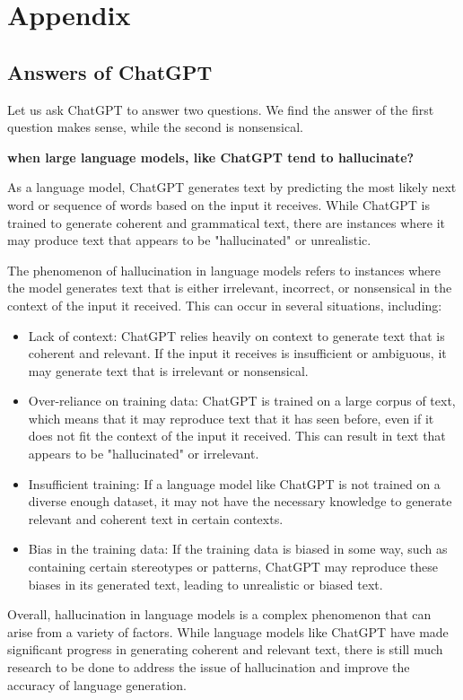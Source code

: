 \section{Appendix}
\label{sec:appendix}

\subsection{Answers of ChatGPT}
Let us ask ChatGPT to answer two questions.
We find the answer of the first question makes sense, while the second is nonsensical.

\textbf{when large language models, like ChatGPT tend to hallucinate?}

As a language model, ChatGPT generates text by predicting the most likely next word or sequence of words based on the input it receives. While ChatGPT is trained to generate coherent and grammatical text, there are instances where it may produce text that appears to be "hallucinated" or unrealistic.

The phenomenon of hallucination in language models refers to instances where the model generates text that is either irrelevant, incorrect, or nonsensical in the context of the input it received. This can occur in several situations, including:
\begin{itemize}
    \item Lack of context: ChatGPT relies heavily on context to generate text that is coherent and relevant. If the input it receives is insufficient or ambiguous, it may generate text that is irrelevant or nonsensical.

    \item Over-reliance on training data: ChatGPT is trained on a large corpus of text, which means that it may reproduce text that it has seen before, even if it does not fit the context of the input it received. This can result in text that appears to be "hallucinated" or irrelevant.
    
    \item Insufficient training: If a language model like ChatGPT is not trained on a diverse enough dataset, it may not have the necessary knowledge to generate relevant and coherent text in certain contexts.
    
    \item Bias in the training data: If the training data is biased in some way, such as containing certain stereotypes or patterns, ChatGPT may reproduce these biases in its generated text, leading to unrealistic or biased text.
\end{itemize}
Overall, hallucination in language models is a complex phenomenon that can arise from a variety of factors. While language models like ChatGPT have made significant progress in generating coherent and relevant text, there is still much research to be done to address the issue of hallucination and improve the accuracy of language generation.

